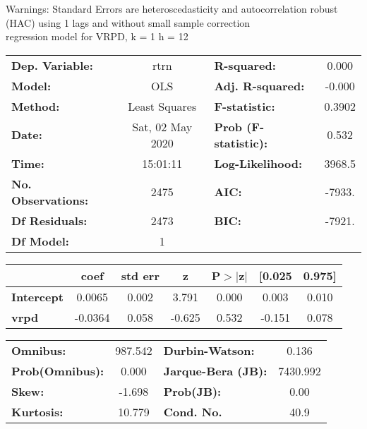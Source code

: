 Warnings: \newline
 [1] Standard Errors are heteroscedasticity and autocorrelation robust (HAC) using 1 lags and without small sample correction\\ 

regression model for VRPD, k = 1 h = 12\begin{center}
\begin{tabular}{lclc}
\toprule
\textbf{Dep. Variable:}    &       rtrn       & \textbf{  R-squared:         } &     0.000   \\
\textbf{Model:}            &       OLS        & \textbf{  Adj. R-squared:    } &    -0.000   \\
\textbf{Method:}           &  Least Squares   & \textbf{  F-statistic:       } &    0.3902   \\
\textbf{Date:}             & Sat, 02 May 2020 & \textbf{  Prob (F-statistic):} &    0.532    \\
\textbf{Time:}             &     15:01:11     & \textbf{  Log-Likelihood:    } &    3968.5   \\
\textbf{No. Observations:} &        2475      & \textbf{  AIC:               } &    -7933.   \\
\textbf{Df Residuals:}     &        2473      & \textbf{  BIC:               } &    -7921.   \\
\textbf{Df Model:}         &           1      & \textbf{                     } &             \\
\bottomrule
\end{tabular}
\begin{tabular}{lcccccc}
                   & \textbf{coef} & \textbf{std err} & \textbf{z} & \textbf{P$> |$z$|$} & \textbf{[0.025} & \textbf{0.975]}  \\
\midrule
\textbf{Intercept} &       0.0065  &        0.002     &     3.791  &         0.000        &        0.003    &        0.010     \\
\textbf{vrpd}      &      -0.0364  &        0.058     &    -0.625  &         0.532        &       -0.151    &        0.078     \\
\bottomrule
\end{tabular}
\begin{tabular}{lclc}
\textbf{Omnibus:}       & 987.542 & \textbf{  Durbin-Watson:     } &    0.136  \\
\textbf{Prob(Omnibus):} &   0.000 & \textbf{  Jarque-Bera (JB):  } & 7430.992  \\
\textbf{Skew:}          &  -1.698 & \textbf{  Prob(JB):          } &     0.00  \\
\textbf{Kurtosis:}      &  10.779 & \textbf{  Cond. No.          } &     40.9  \\
\bottomrule
\end{tabular}
\end{center}

